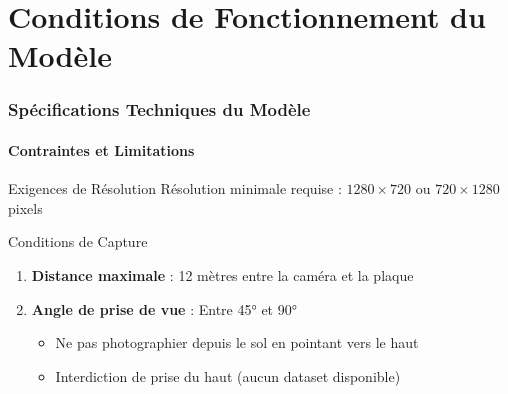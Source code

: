\documentclass[
	11pt,
	aspectratio=169,
]{beamer}
\begin{document}

\section{Conditions de Fonctionnement du Modèle}

\begin{frame}
	\frametitle{Spécifications Techniques du Modèle}
	\framesubtitle{Contraintes et Limitations}
	
	\begin{alertblock}{Exigences de Résolution}
		Résolution minimale requise : $1280 \times 720$ ou $720 \times 1280$ pixels
	\end{alertblock}

	\begin{block}{Conditions de Capture}
		\begin{enumerate}
			\item \textbf{Distance maximale} : 12 mètres entre la caméra et la plaque
			
			\item \textbf{Angle de prise de vue} : Entre 45° et 90°
			\begin{itemize}
				\item Ne pas photographier depuis le sol en pointant vers le haut
				\item \alert{Interdiction de prise du haut} (aucun dataset disponible)
			\end{itemize}
		\end{enumerate}
	\end{block}
\end{frame}

\end{document}
